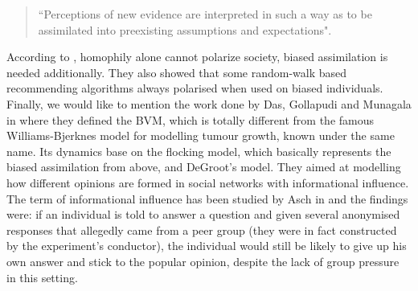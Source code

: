 \documentclass[12pt,a4paper,twoside]{article}
\begin{document}
\begin{quote}
	``Perceptions of new evidence are interpreted in such a way as to be assimilated into preexisting assumptions and expectations".
\end{quote}
According to \cite{Dandekar2013}, homophily alone cannot polarize society, biased assimilation is needed additionally. They also showed that some random-walk based recommending algorithms always polarised when used on biased individuals. Finally, we would like to mention the work done by Das, Gollapudi and Munagala in \cite{Das2014} where they defined the \ac{BVM}, which is totally different from the famous Williams-Bjerknes model \cite{Williams1972} for modelling tumour growth, known under the same name. Its dynamics base on the flocking model, which basically represents the biased assimilation from above, and DeGroot's model. They aimed at modelling how different opinions are formed in social networks with informational influence. The term of informational influence has been studied by Asch in \cite{Asch1955} and the findings were: if an individual is told to answer a question and given several anonymised responses that allegedly came from a peer group (they were in fact constructed by the experiment's conductor), the individual would still be likely to give up his own answer and stick to the popular opinion, despite the lack of group pressure in this setting.
\end{document}
